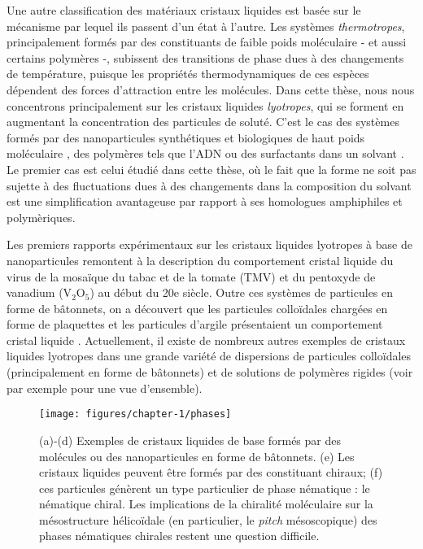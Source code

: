 Une autre classification des matériaux cristaux liquides est basée sur le mécanisme par lequel ils passent d'un état à l'autre. Les systèmes {\em thermotropes}, principalement formés par des constituants de faible poids moléculaire - et aussi certains polymères -, subissent des transitions de phase dues à des changements de température, puisque les propriétés thermodynamiques de ces espèces dépendent des forces d'attraction entre les molécules. Dans cette thèse, nous nous concentrons principalement sur les cristaux liquides {\em lyotropes}, qui se forment en augmentant la concentration des particules de soluté. C'est le cas des systèmes formés par des nanoparticules synthétiques et biologiques de haut poids moléculaire \cite{sonin1998inorganic,dogic-fraden_fil}, des polymères tels que l'ADN \cite{livolantDNAoverview} ou des surfactants dans un solvant \cite{fontell1981}. Le premier cas est celui étudié dans cette thèse, où le fait que la forme ne soit pas sujette à des fluctuations dues à des changements dans la composition du solvant est une simplification avantageuse par rapport à ses homologues amphiphiles et polymèriques.

Les premiers rapports expérimentaux sur les cristaux liquides lyotropes à base de nanoparticules remontent à la description du comportement cristal liquide du virus de la mosaïque du tabac et de la tomate (TMV) \cite{Bawden,Bernal} et du pentoxyde de vanadium (V$_{2}$O$_{5}$) \cite{Zocher} au début du 20e siècle. Outre ces systèmes de particules en forme de bâtonnets, on a découvert que les particules colloïdales chargées en forme de plaquettes et les particules d'argile présentaient un comportement cristal liquide \cite{Langmuir}. Actuellement, il existe de nombreux autres exemples de cristaux liquides lyotropes dans une grande variété de dispersions de particules colloïdales (principalement en forme de bâtonnets) et de solutions de polymères rigides (voir par exemple \cite{Dierking2020} pour une vue d'ensemble).

\begin{figure}
\texttt{[image: figures/chapter-1/phases]}
\caption[Exemples de cristaux liquides basiques formés par des molécules ou des nanoparticules en forme de bâtonnets]{ \label{frenchfig} (a)-(d) Exemples de cristaux liquides de base formés par des molécules ou des nanoparticules en forme de bâtonnets. (e) Les cristaux liquides peuvent être formés par des constituant chiraux; (f) ces particules génèrent un type particulier de phase nématique : le nématique chiral. Les implications de la chiralité moléculaire sur la mésostructure hélicoïdale (en particulier, le {\em pitch} mésoscopique) des phases nématiques chirales restent une question difficile.}
\end{figure}

